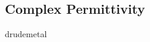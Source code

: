 \documentclass[a4paper,titlepage,onecolumn]{report}
\begin{document}
  \subsection{Complex Permittivity}
  {drudemetal}
%
\end{document}
